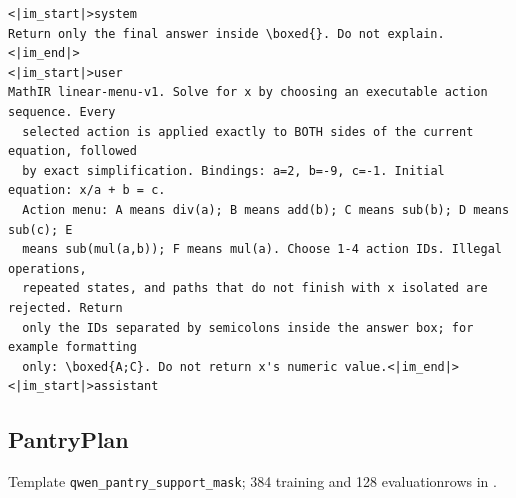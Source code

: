 \documentclass{article}
\newcommand{\1}{\mathbf 1}
\theoremstyle{remark}
\theoremstyle{definition}
\theoremstyle{plain}
\begin{document}
\begin{Verbatim}[fontsize=\scriptsize,frame=single,framesep=4pt,rulecolor=\color{black!25},samepage=true]
<|im_start|>system
Return only the final answer inside \boxed{}. Do not explain.<|im_end|>
<|im_start|>user
MathIR linear-menu-v1. Solve for x by choosing an executable action sequence. Every
  selected action is applied exactly to BOTH sides of the current equation, followed
  by exact simplification. Bindings: a=2, b=-9, c=-1. Initial equation: x/a + b = c.
  Action menu: A means div(a); B means add(b); C means sub(b); D means sub(c); E
  means sub(mul(a,b)); F means mul(a). Choose 1-4 action IDs. Illegal operations,
  repeated states, and paths that do not finish with x isolated are rejected. Return
  only the IDs separated by semicolons inside the answer box; for example formatting
  only: \boxed{A;C}. Do not return x's numeric value.<|im_end|>
<|im_start|>assistant
\end{Verbatim}

\filbreak
\subsection{PantryPlan}
\label{app:prompt-pantry}

\noindent Template \texttt{qwen\_pantry\_support\_mask}; 384 training and 128 evaluation\newline rows in .
\end{document}
